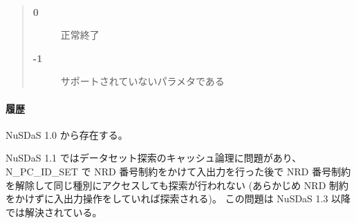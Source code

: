 \paragraph{\ResultCode}
\begin{quote}
\begin{description}
\item[{\bf 0}] 正常終了
\item[{\bf -1}] サポートされていないパラメタである
\end{description}\end{quote}

\paragraph{履歴}
NuSDaS 1.0 から存在する。

NuSDaS 1.1 ではデータセット探索のキャッシュ論理に問題があり、
N\_PC\_ID\_SET で NRD 番号制約をかけて入出力を行った後で
NRD 番号制約を解除して同じ種別にアクセスしても探索が行われない
(あらかじめ NRD 制約をかけずに入出力操作をしていれば探索される)。
この問題は NuSDaS 1.3 以降では解決されている。
